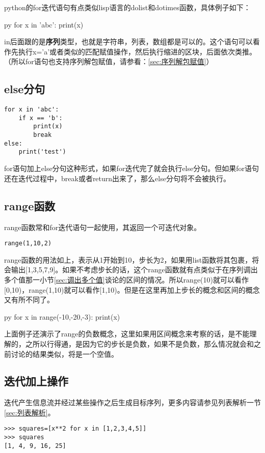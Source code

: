 \documentclass[12pt,oneside]{book}
\begin{document}
\begin{common-format}
python的for迭代语句有点类似lisp语言的dolist和dotimes函数，具体例子如下：
\begin{xverbatim}[129]{py}
for x in 'abc':
    print(x)
\end{xverbatim}
in后面跟的是\textbf{序列}类型，也就是字符串，列表，数组都是可以的。这个语句可以看作先执行x='a'或者类似的匹配赋值操作，然后执行缩进的区块，后面依次类推。（所以for语句也支持序列解包赋值，请参看：\ref{sec:序列解包赋值}）

\subsection{else分句}
\begin{Verbatim}
for x in 'abc':
    if x == 'b':
        print(x)
        break
else:
    print('test')
\end{Verbatim}

for语句加上else分句这种形式，如果for迭代完了就会执行else分句。但如果for语句还在迭代过程中，break或者return出来了，那么else分句将不会被执行。


\subsection{range函数}
range函数常和for迭代语句一起使用，其返回一个可迭代对象。

\begin{Verbatim}
range(1,10,2)
\end{Verbatim}

range函数的用法如上，表示从1开始到10，步长为2，如果用list函数将其包裹，将会输出[1,3,5,7,9]。如果不考虑步长的话，这个range函数就有点类似于在序列调出多个值那一小节\ref{sec:调出多个值}谈论的区间的情况。所以range(10)就可以看作[0,10)，range(1,10)就可以看作[1,10)。但是在这里再加上步长的概念和区间的概念又有所不同了。

\begin{xverbatim}[129]{py}
for x in range(-10,-20,-3):
    print(x)
\end{xverbatim}
上面例子还演示了range的负数概念，这里如果用区间概念来考察的话，是不能理解的，之所以行得通，是因为它的步长是负数，如果不是负数，那么情况就会和之前讨论的结果类似，将是一个空值。


\subsection{迭代加上操作}
迭代产生信息流并经过某些操作之后生成目标序列，更多内容请参见列表解析一节\ref{sec:列表解析}。
\begin{Verbatim}
>>> squares=[x**2 for x in [1,2,3,4,5]]
>>> squares
[1, 4, 9, 16, 25]
\end{Verbatim}



\end{common-format}
\end{document}
